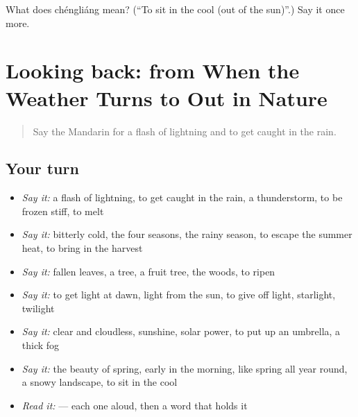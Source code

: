 \begin{tcolorbox}[breakable,colback=teal!4,colframe=teal!35!black,title={Before you move on}]
What does chéngliáng mean? (\textquotedblleft{}To sit in the cool (out of the sun)\textquotedblright{}.) Say it once more.
\end{tcolorbox}
\section[(dialogue)]{Looking back: from When the Weather Turns to Out in Nature}

\label{lesson:ZH-R519-review-514-519}



\begin{quote}
Say the Mandarin for a flash of lightning and to get caught in the rain.
\end{quote}

\subsection*{Your turn}
\begin{itemize}
\raggedright
  \item \emph{Say it:} a flash of lightning, to get caught in the rain, a thunderstorm, to be frozen stiff, to melt
  \item \emph{Say it:} bitterly cold, the four seasons, the rainy season, to escape the summer heat, to bring in the harvest
  \item \emph{Say it:} fallen leaves, a tree, a fruit tree, the woods, to ripen
  \item \emph{Say it:} to get light at dawn, light from the sun, to give off light, starlight, twilight
  \item \emph{Say it:} clear and cloudless, sunshine, solar power, to put up an umbrella, a thick fog
  \item \emph{Say it:} the beauty of spring, early in the morning, like spring all year round, a snowy landscape, to sit in the cool
  \item \emph{Read it:}     — each one aloud, then a word that holds it
\end{itemize}

